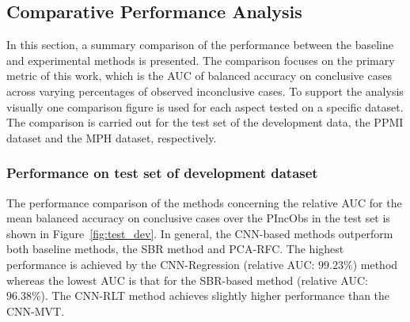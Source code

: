 \subsection{Comparative Performance Analysis}
\label{subsec:compar_anal}

In this section, a summary comparison of the performance between the baseline and experimental methods is presented.
The comparison focuses on the primary metric of this work, 
which is the AUC of balanced accuracy on conclusive cases across varying percentages of observed inconclusive cases. 
To support the analysis visually one comparison figure is used for each aspect tested on a specific dataset.
The comparison is carried out for the test set of the development data, 
the PPMI dataset and the MPH dataset, respectively.

\subsubsection{Performance on test set of development dataset}

\begin{comment}
Figure~\ref{fig:test_interval_match_dev} provides a comparison of the transferability of the inconclusive intervals 
from the validation set to the test set (development data) along the baseline and experimental methods.
The mean and standard deviation of observed inconclusive cases (PIncObs) in the test set 
is very similar across the baseline and experimental methods.
For each considered method the mean of the PIncObs hardly deviates from the identity line.
The similarity in data distribution of the validation and test set due to random splitting is an explanation for that.
\end{comment}

The performance comparison of the methods concerning the relative AUC for the mean balanced accuracy on conclusive cases
over the PIncObs in the test set is shown in Figure~\ref{fig:test_dev}.
In general, the CNN-based methods outperform both baseline methods, the SBR method and PCA-RFC.
The highest performance is achieved by the CNN-Regression (relative AUC: $99.23\%$) method 
whereas the lowest AUC is that for the SBR-based method (relative AUC: $96.38\%$).
The CNN-RLT method achieves slightly higher performance than the CNN-MVT.


